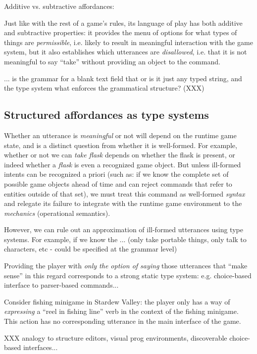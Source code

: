 \documentclass[sigconf]{acmart}
\begin{document}
  Additive vs. subtractive affordances:

  Just like with the rest of a game's rules, its language of play has both
  additive and subtractive properties: it provides the menu of options for
  what types of things are {\em permissible}, i.e. likely to result in
  meaningful interaction with the game system, but it also establishes
  which utterances are {\em disallowed}, i.e. that it is not meaningful to
  say ``take'' without providing an object to the command.

  ... is the grammar for a blank text field that or is it just any typed
  string, and the type system what enforces the grammatical structure?
  (XXX)

  \subsection{Structured affordances as type systems}
  
  Whether an utterance is {\em meaningful} or not will depend on
  the runtime game state, and is a distinct question from whether it is
  well-formed. For example, whether or not we can {\em take
  flask} depends on whether the flask is present, or indeed whether a {\em
  flask} is even a recognized game object. But unless ill-formed intents can be
  recognized a priori (such as: if we know the complete set of possible
  game objects ahead of time and can reject commands that refer to entities
  outside of that set), we must treat this command as well-formed {\em
  syntax} and relegate its failure to integrate with the runtime game
  environment to the {\em mechanics} (operational semantics).

  However, we can rule out an approximation of ill-formed utterances using
  type systems. For example, if we know the ...
  (only take portable things, only talk to characters, etc - could be
  specified at the grammar level)
  
  Providing the player with {\em only the option of saying} those
  utterances that ``make sense'' in this regard corresponds to a strong
  static type system: e.g. choice-based interface to parser-based
  commands...

  Consider fishing minigame in Stardew Valley: the player only has a way of
  {\em expressing} a ``reel in fishing line'' verb in the context of the
  fishing minigame. This action has no corresponding utterance in the main
  interface of the game.

  XXX analogy to structure editors, visual prog environments, discoverable
  choice-based interfaces...
\end{document}
